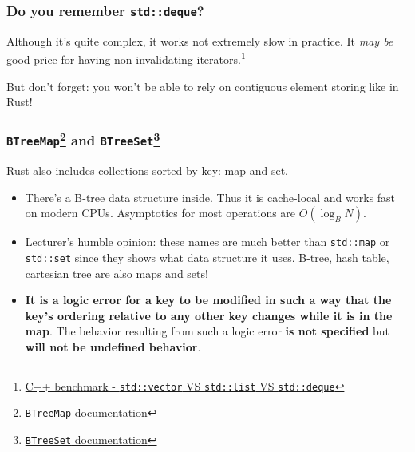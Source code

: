 \documentclass[aspectratio=1610,t]{beamer}
\begin{document}

\begin{frame}[fragile]
\frametitle{Do you remember \texttt{std::deque}?}
Although it's quite complex, it works not extremely slow in practice. It \textit{may be} good price for having non-invalidating iterators.\footnote{\href{https://baptiste-wicht.com/posts/2012/12/cpp-benchmark-vector-list-deque.html}{C++ benchmark - \texttt{std::vector} VS \texttt{std::list} VS \texttt{std::deque}}}

But don't forget: you won't be able to rely on contiguous element storing like in Rust!
\end{frame}


\begin{frame}[fragile]
\frametitle{\texttt{BTreeMap}\footnote{\href{https://doc.rust-lang.org/std/collections/struct.BTreeMap.html}{\texttt{BTreeMap} documentation}} and \texttt{BTreeSet}\footnote{\href{https://doc.rust-lang.org/std/collections/struct.BTreeSet.html}{\texttt{BTreeSet} documentation}}}
Rust also includes collections sorted by key: map and set.

\begin{itemize}
    \item<2-> There's a B-tree data structure inside. Thus it is cache-local and works fast on modern CPUs. Asymptotics for most operations are $O(\log_BN)$.
    \item<3-> Lecturer's humble opinion: these names are much better than \texttt{std::map} or \texttt{std::set} since they shows what data structure it uses. B-tree, hash table, cartesian tree are also maps and sets!
    \item<4-> \textbf{It is a logic error for a key to be modified in such a way that the key’s ordering relative to any other key changes while it is in the map}. The behavior resulting from such a logic error \textbf{is not specified} but \textbf{will not be undefined behavior}.
\end{itemize}
\end{frame}

\end{document}
